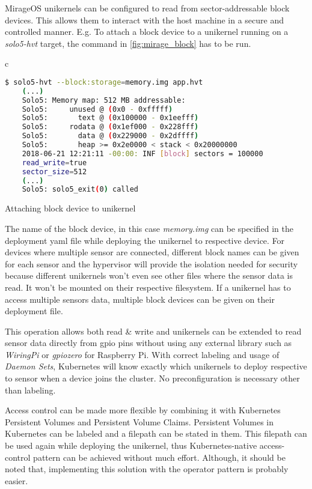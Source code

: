 MirageOS unikernels can be configured to read from sector-addressable block devices. This allows them to interact with the host machine in a secure and controlled manner. E.g. To attach a block device to a unikernel running on a \textit{solo5-hvt} target, the command in \ref{fig:mirage_block} has to be run.

\begin{code}[htpb]
  \centering
  \begin{tabular}{c}
  \begin{lstlisting}[language=bash]
    $ solo5-hvt --block:storage=memory.img app.hvt
    (...)
    Solo5: Memory map: 512 MB addressable:
    Solo5:     unused @ (0x0 - 0xfffff)
    Solo5:       text @ (0x100000 - 0x1eefff)
    Solo5:     rodata @ (0x1ef000 - 0x228fff)
    Solo5:       data @ (0x229000 - 0x2dffff)
    Solo5:       heap >= 0x2e0000 < stack < 0x20000000
    2018-06-21 12:21:11 -00:00: INF [block] sectors = 100000
    read_write=true
    sector_size=512
    (...)
    Solo5: solo5_exit(0) called
\end{lstlisting}
\end{tabular}
\caption{Attaching block device to unikernel}\label{fig:mirage_block}
\end{code}

The name of the block device, in this case \textit{memory.img} can be specified in the deployment yaml file while deploying the unikernel to respective device. For devices where multiple sensor are connected, different block names can be given for each sensor and the hypervisor will provide the isolation needed for security because different unikernels won't even see other files where the sensor data is read. It won't be mounted on their respective filesystem. If a unikernel has to access multiple sensors data, multiple block devices can be given on their deployment file. 

This operation allows both read \& write and unikernels can be extended to read sensor data directly from gpio pins without using any external library such as \textit{WiringPi} or \textit{gpiozero} for Raspberry Pi. With correct labeling and usage of \textit{Daemon Sets}, Kubernetes will know exactly which unikernels to deploy respective to sensor when a device joins the cluster. No preconfiguration is necessary other than labeling.

Access control can be made more flexible by combining it with Kubernetes Persistent Volumes and Persistent Volume Claims. Persistent Volumes in Kubernetes can be labeled and a filepath can be stated in them. This filepath can be used again while deploying the unikernel, thus Kubernetes-native access-control pattern can be achieved without much effort. Although, it should be noted that, implementing this solution with the operator pattern is probably easier.
